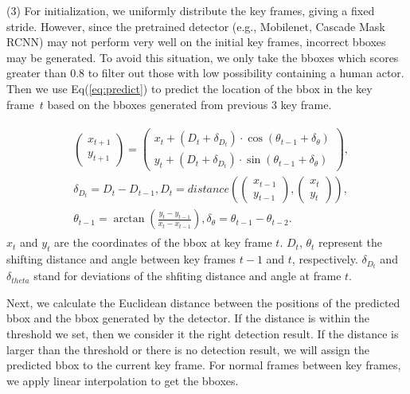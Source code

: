 \documentclass[letterpaper, 10 pt, conference]{ieeeconf}
\begin{document}
    \noindent (3) For initialization, we uniformly distribute the key frames, giving a fixed stride. However, since the pretrained detector (e.g., Mobilenet, Cascade Mask RCNN) may not perform very well on the initial key frames, incorrect bboxes may be generated. To avoid this situation, we only take the bboxes which scores greater than 0.8 to filter out those with low possibility containing a human actor. Then we use Eq(\ref{eq:predict}) to predict the location of the bbox in the key frame~$t$ based on the bboxes generated from previous 3 key frame. 

    \begin{align}
    \begin{split}
    \label{eq:predict}
    &\begin{pmatrix}
            x_{t+1}\\
            y_{t+1}
        \end{pmatrix}
        =
        \begin{pmatrix}
            x_{t}+ (D_t + \delta_{D_t}) \cdot \cos{(\theta_{t-1}+\delta_{\theta})}\\
            y_{t}+ (D_t + \delta_{D_t}) \cdot \sin{(\theta_{t-1}+\delta_{\theta})}
        \end{pmatrix}, \\
    &\delta_{D_t} = D_{t} - D_{t-1} ,D_{t} = distance \left(\begin{pmatrix}
        x_{t-1}\\
        y_{t-1}
    \end{pmatrix},\begin{pmatrix}
        x_{t}\\
        y_{t}
    \end{pmatrix}\right), \\
    &\theta_{t-1} =  \arctan(\frac{y_{t}-y_{t-1}}{x_{t}-x_{t-1}}), \delta_{\theta} = \theta_{t-1} - \theta_{t-2}. 
    \end{split}
    \end{align}
  $x_t$ and $y_t$ are the coordinates of the bbox at key frame $t$. $D_{t}$, $\theta_{t}$ represent the shifting distance and angle between key frames $t-1$ and $t$, respectively. $\delta_{D_t}$ and $\delta_{theta}$ stand for deviations of the shfiting distance and angle at frame $t$.
  
  Next, we calculate the Euclidean distance between the positions of the predicted bbox and the bbox generated by the detector. If the distance is within the threshold we set, then we consider it the right detection result. If the distance is larger than the threshold or there is no detection result, we will assign the predicted bbox to the current key frame. For normal frames between key frames, we apply linear interpolation to get the bboxes.
\end{document}
